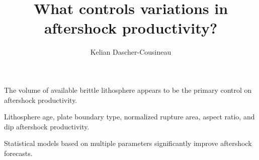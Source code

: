 \documentclass[draft, jgrga]{agujournal2018}
\author{Kelian Dascher-Cousineau}
\begin{document}
\large
\title{What controls variations in aftershock productivity?}













\begin{keypoints}
\item The volume of available brittle lithosphere appears to be the primary control on aftershock productivity.
\item Lithosphere age, plate boundary type, normalized rupture area, aspect ratio, and dip   aftershock productivity.
\item Statistical models based on multiple parameters significantly improve aftershock forecasts.
\end{keypoints}
\end{document}
